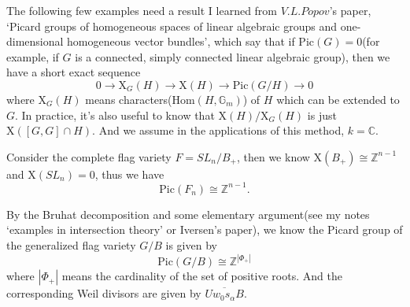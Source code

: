 \documentclass[../main.tex]{subfiles}
\begin{document}
\begin{example}

\end{example}
The following few examples need a result I learned from $V.L.Popov$'s  paper, `Picard groups of homogeneous spaces of linear algebraic groups and one-dimensional homogeneous vector bundles', which say that if $\mathrm{Pic}(G)=0$(for example, if $G$ is a connected, simply connected linear algebraic group), then we have a short exact sequence 
$$0\rightarrow \mathrm{X}_{G}(H)\rightarrow \mathrm{X}(H)\rightarrow \mathrm{Pic}(G/H)\rightarrow 0$$
where $\mathrm{X}_{G}(H)$ means characters($\mathrm{Hom}(H,\mathbb{G}_{m})$) of $H$ which can be extended to $G$. In practice, it's also useful to know that $\mathrm{X}(H)/\mathrm{X}_{G}(H)$ is just $\mathrm{X}([G,G]\cap H)$.  And we assume in the applications of this method, $k=\mathbb{C}$.
\begin{example}
Consider the complete flag variety $F=SL_{n}/B_{+}$, then we know $\mathrm{X}(B_{+})\cong \mathbb{Z}^{n-1}$ and $\mathrm{X}(SL_{n})=0$, thus we have 
$$\mathrm{Pic}(F_{n})\cong \mathbb{Z}^{n-1}.$$
\end{example}
\begin{remark}
By the Bruhat decomposition and some elementary argument(see my notes `examples in intersection theory' or Iversen's paper), we know the Picard group of the generalized flag variety $G/B$ is given by 
$$\mathrm{Pic}(G/B)\cong \mathbb{Z}^{|\Phi_{+}|}$$
where $|\Phi_{+}|$ means the cardinality of the set of positive roots. And the corresponding Weil divisors are given by $\overline{Uw_{0}s_{\alpha}B}$.
\end{remark}
\end{document}
